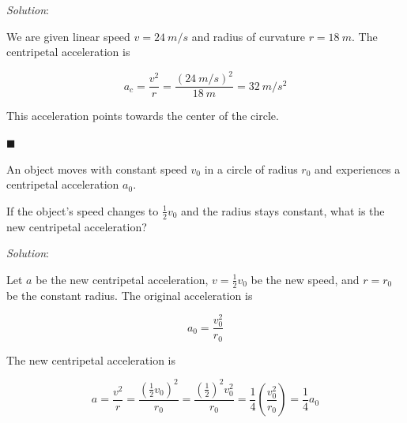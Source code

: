 \documentclass[dvipsnames]{article}
\begin{document}
\textit{Solution}:

We are given linear speed $v = \SI{24}{m/s}$ and radius of curvature $r = \SI{18}{m}$. The centripetal acceleration is

\begin{equation*}
    a_c = \frac{v^2}{r} = \frac{\left(\SI{24}{m/s}\right)^2}{\SI{18}{m}} = \boxed{\SI{32}{m/s^2}}
\end{equation*}

This acceleration points towards the center of the circle.

\hfill $\blacksquare$

\begin{example}
An object moves with constant speed $v_0$ in a circle of radius $r_0$ and experiences a centripetal acceleration $a_0$. 

\begin{center}
\end{center}

If the object's speed changes to $\frac{1}{2}v_0$ and the radius stays constant, what is the new centripetal acceleration?
\end{example}

\textit{Solution}:

Let $a$ be the new centripetal acceleration, $v = \frac{1}{2}v_0$ be the new speed, and $r = r_0$ be the constant radius. The original acceleration is

\begin{equation*}
    a_0 = \frac{v_0^2}{r_0}
\end{equation*}


The new centripetal acceleration is

\begin{equation*}
    a = \frac{v^2}{r} = \frac{\left(\frac{1}{2}v_0\right)^2}{r_0} = \frac{\left(\frac{1}{2}\right)^2v_0^2}{r_0} = \frac{1}{4} \left(\frac{v_0^2}{r_0}\right) = \frac{1}{4} a_0
\end{equation*}
\end{document}
